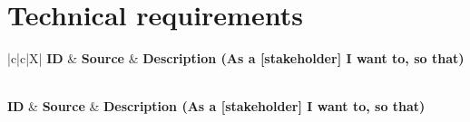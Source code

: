 \section*{Technical requirements}
\begin{center}
	\begin{xltabular}{\textwidth}{|c|c|X|}
		\hline
		\textbf{ID} & \textbf{Source} & \textbf{Description (As a [stakeholder] I want to, so that)}\\
		\endfirsthead
		
		\hline
		 \\
		\hline
		\textbf{ID} & \textbf{Source} & \textbf{Description (As a [stakeholder] I want to, so that)}\\
		\endhead
		
		 \\
		\hline
		\endfoot
		
		\endlastfoot
		

\end{xltabular}
\end{center}
